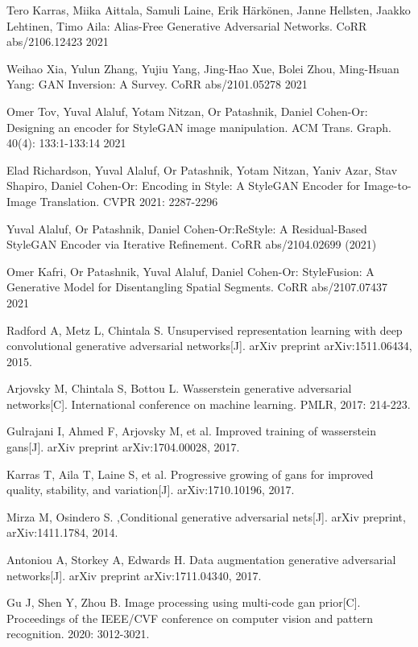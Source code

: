 \begin{description}
\item Tero Karras, Miika Aittala, Samuli Laine, Erik Härkönen, Janne Hellsten, Jaakko Lehtinen, Timo Aila: Alias-Free Generative Adversarial Networks. CoRR abs/2106.12423 2021
\item Weihao Xia, Yulun Zhang, Yujiu Yang, Jing-Hao Xue, Bolei Zhou, Ming-Hsuan Yang: GAN Inversion: A Survey. CoRR abs/2101.05278 2021
\item Omer Tov, Yuval Alaluf, Yotam Nitzan, Or Patashnik, Daniel Cohen-Or:
Designing an encoder for StyleGAN image manipulation. ACM Trans. Graph. 40(4): 133:1-133:14 2021
\item Elad Richardson, Yuval Alaluf, Or Patashnik, Yotam Nitzan, Yaniv Azar, Stav Shapiro, Daniel Cohen-Or: Encoding in Style: A StyleGAN Encoder for Image-to-Image Translation. CVPR 2021: 2287-2296
\item Yuval Alaluf, Or Patashnik, Daniel Cohen-Or:ReStyle: A Residual-Based StyleGAN Encoder via Iterative Refinement. CoRR abs/2104.02699 (2021)
\item Omer Kafri, Or Patashnik, Yuval Alaluf, Daniel Cohen-Or: StyleFusion: A Generative Model for Disentangling Spatial Segments. CoRR abs/2107.07437 2021
\item Radford A, Metz L, Chintala S. Unsupervised representation learning with deep convolutional generative adversarial networks[J]. arXiv preprint arXiv:1511.06434, 2015.
\item Arjovsky M, Chintala S, Bottou L. Wasserstein generative adversarial networks[C]. International conference on machine learning. PMLR, 2017: 214-223.
\item Gulrajani I, Ahmed F, Arjovsky M, et al. Improved training of wasserstein gans[J]. arXiv preprint arXiv:1704.00028, 2017.
\item Karras T, Aila T, Laine S, et al. Progressive growing of gans for improved quality, stability, and variation[J]. arXiv:1710.10196, 2017.
\item Mirza M, Osindero S. ,Conditional generative adversarial nets[J]. arXiv preprint, arXiv:1411.1784, 2014.
\item Antoniou A, Storkey A, Edwards H. Data augmentation generative adversarial networks[J]. arXiv preprint arXiv:1711.04340, 2017.
\item Gu J, Shen Y, Zhou B. Image processing using multi-code gan prior[C]. Proceedings of the IEEE/CVF conference on computer vision and pattern recognition. 2020: 3012-3021.
\end{description}

